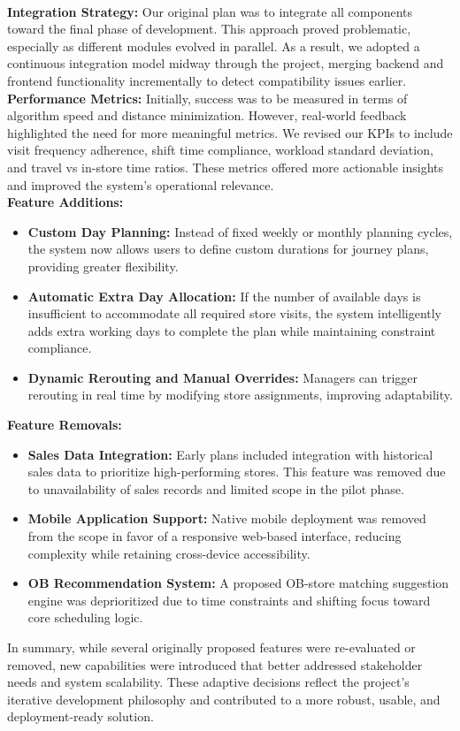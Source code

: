 \\
\textbf{Integration Strategy:} Our original plan was to integrate all components toward the final phase of development. This approach proved problematic, especially as different modules evolved in parallel. As a result, we adopted a continuous integration model midway through the project, merging backend and frontend functionality incrementally to detect compatibility issues earlier.
\\
\textbf{Performance Metrics:} Initially, success was to be measured in terms of algorithm speed and distance minimization. However, real-world feedback highlighted the need for more meaningful metrics. We revised our KPIs to include visit frequency adherence, shift time compliance, workload standard deviation, and travel vs in-store time ratios. These metrics offered more actionable insights and improved the system’s operational relevance.
\\
\textbf{Feature Additions:}
\begin{itemize}
    \item \textbf{Custom Day Planning:} Instead of fixed weekly or monthly planning cycles, the system now allows users to define custom durations for journey plans, providing greater flexibility.
    \item \textbf{Automatic Extra Day Allocation:} If the number of available days is insufficient to accommodate all required store visits, the system intelligently adds extra working days to complete the plan while maintaining constraint compliance.
    \item \textbf{Dynamic Rerouting and Manual Overrides:} Managers can trigger rerouting in real time by modifying store assignments, improving adaptability.
\end{itemize}

\textbf{Feature Removals:}
\begin{itemize}
    \item \textbf{Sales Data Integration:} Early plans included integration with historical sales data to prioritize high-performing stores. This feature was removed due to unavailability of sales records and limited scope in the pilot phase.
    \item \textbf{Mobile Application Support:} Native mobile deployment was removed from the scope in favor of a responsive web-based interface, reducing complexity while retaining cross-device accessibility.
    \item \textbf{OB Recommendation System:} A proposed OB-store matching suggestion engine was deprioritized due to time constraints and shifting focus toward core scheduling logic.
\end{itemize}

In summary, while several originally proposed features were re-evaluated or removed, new capabilities were introduced that better addressed stakeholder needs and system scalability. These adaptive decisions reflect the project’s iterative development philosophy and contributed to a more robust, usable, and deployment-ready solution.
